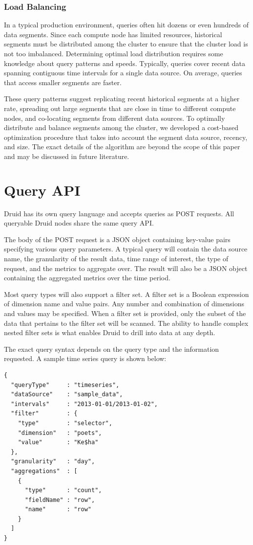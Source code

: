 \documentclass{vldb}
\begin{document}
\subsubsection{Load Balancing}
In a typical production environment, queries often hit dozens or even
hundreds of data segments. Since each compute node has limited
resources, historical segments must be distributed among the cluster
to ensure that the cluster load is not too imbalanced. Determining
optimal load distribution requires some knowledge about query patterns
and speeds. Typically, queries cover recent data spanning contiguous
time intervals for a single data source.  On average, queries that
access smaller segments are faster.

These query patterns suggest replicating recent historical segments at
a higher rate, spreading out large segments that are close in time to
different compute nodes, and co-locating segments from different data
sources.  To optimally distribute and balance segments among the
cluster, we developed a cost-based optimization procedure that takes
into account the segment data source, recency, and size. The exact
details of the algorithm are beyond the scope of this paper and may be discussed in future literature.

\section{Query API}
\label{sec:query-api}
Druid has its own query language and accepts queries as POST requests. All queryable
Druid nodes share the same query API.

The body of the POST request is
a JSON object containing key-value pairs specifying various query
parameters. A typical query will contain the data source name, the
granularity of the result data, time range of interest, the
type of request, and the metrics to aggregate over. The result will also be a JSON object
containing the aggregated metrics over the time period.

Most query types will also support a filter set. A filter set is a Boolean expression of dimension name and value
pairs. Any number and combination of dimensions and values may be specified.
When a filter set is provided, only the subset of the data that pertains to the filter set will be scanned.
The ability to handle complex nested filter sets is what enables Druid 
to drill into data at any depth.

The exact query syntax depends on the query type and the information requested.
A sample time series query is shown below:
\begin{verbatim}
{
  "queryType"     : "timeseries",
  "dataSource"    : "sample_data",
  "intervals"     : "2013-01-01/2013-01-02",
  "filter"        : {
    "type"        : "selector",
    "dimension"   : "poets",
    "value"       : "Ke$ha"
  },
  "granularity"   : "day",
  "aggregations"  : [
    {
      "type"      : "count",
      "fieldName" : "row",
      "name"      : "row"
    }
  ]
}
\end{verbatim}
\end{document}
